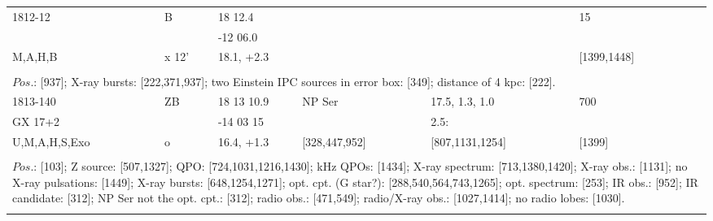 \documentclass{aa}
\begin{document}
\begin{tabular}{p{2.5cm}p{1cm}p{1.8cm}p{2.3cm}p{3.3cm}p{2.0cm}p{2.2cm}}
\noalign{\smallskip}
1812-12        & B              & 18 12.4                &                     &                            & 15                     &          \\
                       &                  & -12 06.0               &                     &                            &                          &         \\
M,A,H,B       & x 12'        & 18.1, +2.3             &                      &                           & [1399,1448]    &         \\
\\  
\multicolumn{7}{p{17.5cm}}{
$Pos$.: [937]; X-ray bursts: [222,371,937]; two Einstein IPC sources in error box: [349]; distance of 4 kpc: [222].}\\
\noalign{\smallskip}
\hline

\noalign{\smallskip}
1813-140            & ZB           & 18 13 10.9           & NP Ser                 & 17.5, 1.3, 1.0              & 700                        &          \\
GX 17+2             &                  & -14 03 15             &                               & 2.5:                               &                               &         \\
U,M,A,H,S,Exo  & o              & 16.4, +1.3             & [328,447,952]     & [807,1131,1254]        & [1399]                   &          \\
\\
\multicolumn{7}{p{17.5cm}}{
$Pos$.: [103]; Z source: [507,1327]; QPO: [724,1031,1216,1430]; kHz QPOs: [1434]; X-ray spectrum: [713,1380,1420]; 
X-ray obs.: [1131]; no X-ray pulsations: [1449]; X-ray bursts: [648,1254,1271]; opt. cpt. (G star?): [288,540,564,743,1265]; 
opt. spectrum: [253]; IR obs.: [952]; IR candidate: [312]; NP Ser not the opt. cpt.: [312]; radio obs.: [471,549]; 
radio/X-ray obs.: [1027,1414]; no radio lobes: [1030].}\\
\noalign{\smallskip}
\hline


\end{tabular}
\end{document}
